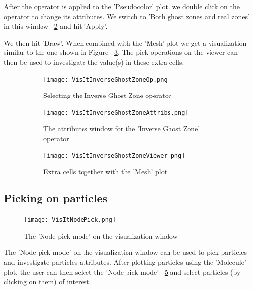 After the operator is applied to the 'Pseudocolor' plot, we double
click on the operator to change its attributes. We switch to 'Both
ghost zones and real zones' in this window
~\ref{VisItInverseGhostZoneAttribs} and hit 'Apply'.

We then hit 'Draw'. When combined with the 'Mesh' plot we get a visualization similar to the one shown in Figure ~\ref{VisItInverseGhostZoneViewer}. The pick operations on the viewer can then be used to investigate the value(s) in these extra cells. 

\begin{figure}[htb]
  \centering
  \begin{subfigure}[b]{0.3\textwidth}
  \centering
    \texttt{[image: VisItInverseGhostZoneOp.png]}
    \caption{Selecting the Inverse Ghost Zone operator}
    \label{VisItInverseGhostZoneOp}
  \end{subfigure}
  \begin{subfigure}[b]{0.3\textwidth}
  \centering
    \texttt{[image: VisItInverseGhostZoneAttribs.png]}
    \caption{The attributes window for the 'Inverse Ghost Zone' operator}
    \label{VisItInverseGhostZoneAttribs}
  \end{subfigure}
  \begin{subfigure}[b]{0.3\textwidth}
  \centering
    \texttt{[image: VisItInverseGhostZoneViewer.png]}
    \caption{Extra cells together with the 'Mesh' plot}
    \label{VisItInverseGhostZoneViewer}
  \end{subfigure}
  \caption{}
  \label{ucf.fig11}
\end{figure}


\subsection{Picking on particles}

 \begin{figure}
   \vspace{-40pt}
   \center
   \texttt{[image: VisItNodePick.png]}
   \caption{The 'Node pick mode' on the visualization window}
   \label{VisItNodePick}
 \end{figure}

The 'Node pick mode' on the visualization window can be used to pick
particles and investigate particles attributes. After plotting
particles using the 'Molecule' plot, the user can then select the
'Node pick mode' ~\ref{VisItNodePick} and select particles (by
clicking on them) of interest.

